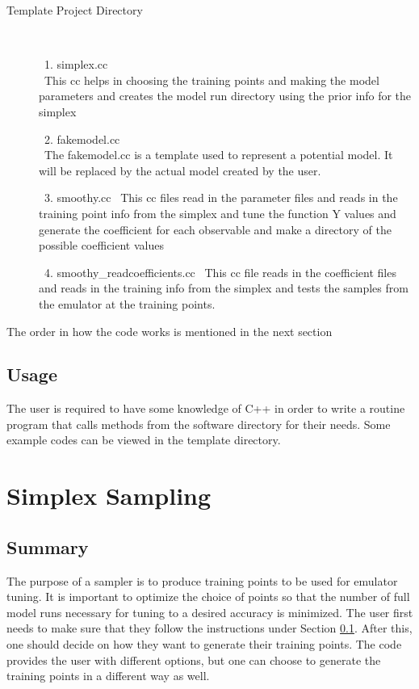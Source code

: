 \documentclass[12pt]{article}
\numberwithin{equation}{section}
\numberwithin{figure}{section}
\begin{document}
\begin{description}
\item[Template Project Directory] \

\ 1. simplex.cc \\
\ This cc helps in choosing the training points and making the model parameters and creates the model run directory using the prior info for the simplex 

\ 2. fakemodel.cc \\
\ The fakemodel.cc is a template used to represent a potential model. It will be replaced by the actual model created by the user. 

\ 3. smoothy.cc 
\ This cc files read in the parameter files and reads in the training point info from the simplex and tune the function Y values and generate the coefficient for each observable and make a directory of the possible coefficient values 

\ 4. smoothy\_readcoefficients.cc 
\ This cc file reads in the coefficient files and reads in the training info from the simplex and tests the samples from the emulator at the training points. 

\end{description}

The order in how the code works is mentioned in the next section 


\subsection{Usage}
\label{sec:Usage}

The user is required to have some knowledge of C++ in order to write a routine program that calls methods from the software directory for their needs. Some example codes can be viewed in the template directory.

\section{Simplex Sampling}

\subsection{Summary}
The purpose of a sampler is to produce training points to be used for emulator tuning. It is important to optimize the choice of points so that the number of full model runs necessary for tuning to a desired accuracy is minimized. The user first needs to make sure that they follow the instructions under Section \ref{sec:Usage}. After this, one should decide on how they want to generate their training points. The code provides the user with different options, but one can choose to generate the training points in a different way as well.
\end{document}
